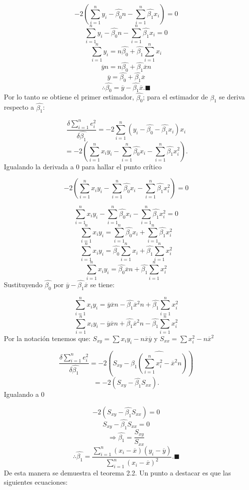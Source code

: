 \documentclass[
  a4paper,
  oneside,
  openany]{book}
\begin{document}
\[-2\left(\sum_{i=1}^{n}y_{i}-\hat{\beta_{0}}n-\sum_{i=1}^{n}\hat{\beta_{1}}x_{i}\right)=0\]
\[\sum_{i=1}^{n}y_{i}-\hat{\beta_{0}}n-\sum_{i=1}^{n}\hat{\beta_{1}}x_{i}=0\]
\[\sum_{i=1}^{n}y_{i}=n\hat{\beta_{0}}+\hat{\beta_{1}}\sum_{i=1}^{n}x_{i}\]
\[\overline{y}n=n\hat{\beta_{0}}+\hat{\beta_{1}}\overline{x}n\]
\[\overline{y}=\hat{\beta_{0}}+\hat{\beta_{1}}\overline{x}\]
\[\therefore\hat{\beta_{0}}=\overline{y}-\hat{\beta_{1}}\overline{x}.\blacksquare\]
Por lo tanto se obtiene el primer estimador, \(\hat{\beta_{0}}\); para el estimador de \(\beta_{1}\) se deriva respecto a \(\hat{\beta_{1}}\):

\[\frac{\delta\sum_{i=1}^{n}e_{i}^2}{\delta\hat{\beta_{1}}}=-2\sum_{i=1}^{n}(y_{i}-\hat{\beta_{0}}-\hat{\beta_{1}}x_{i})x_{i}\]
\[=-2\left(\sum_{i=1}^{n}x_{i}y_{i}-\sum_{i=1}^{n}\hat{\beta_{0}}x_{i}-\sum_{i=1}^{n}\hat{\beta_{1}}x_{i}^2\right).\]
Igualando la derivada a 0 para hallar el punto crítico

\[-2\left(\sum_{i=1}^{n}x_{i}y_{i}-\sum_{i=1}^{n}\hat{\beta_{0}}x_{i}-\sum_{i=1}^{n}\hat{\beta_{1}}x_{i}^2\right)=0\]

\[\sum_{i=1}^{n}x_{i}y_{i}-\sum_{i=1}^{n}\hat{\beta_{0}}x_{i}-\sum_{i=1}^{n}\hat{\beta_{1}}x_{i}^2=0\]
\[\sum_{i=1}^{n}x_{i}y_{i}=\sum_{i=1}^{n}\hat{\beta_{0}}x_{i}+\sum_{i=1}^{n}\hat{\beta_{1}}x_{i}^2\]
\[\sum_{i=1}^{n}x_{i}y_{i}=\hat{\beta_{0}}\sum_{i=1}^{n}x_{i}+\hat{\beta_{1}}\sum_{i=1}^{n}x_{i}^2\]
\[\sum_{i=1}^{n}x_{i}y_{i}=\hat{\beta_{0}}\overline{x}n+\hat{\beta_{1}}\sum_{i=1}^{n}x_{i}^2\]
Sustituyendo \(\hat{\beta_{0}}\) por \(\overline{y}-\hat{\beta_{1}}\overline{x}\) se tiene:

\[\sum_{i=1}^{n}x_{i}y_{i}=\overline{y}\overline{x}n-\hat{\beta_{1}}\overline{x}^2n+\hat{\beta_{1}}\sum_{i=1}^{n}x_{i}^2\]
\[\sum_{i=1}^{n}x_{i}y_{i}-\overline{y}\overline{x}n+\hat{\beta_{1}}\overline{x}^2n-\hat{\beta_{1}}\sum_{i=1}^{n}x_{i}^2\]
Por la notación tenemos que: \(S_{xy}=\sum x_{i}y_{i} - n \overline{x}\overline{y}\) y \(S_{xx}= \sum x_{i}^2 - n\overline{x}^2\)

\[\frac{\delta \sum_{i=1}^{n}e_{i}^2}{\delta\hat{\beta_{1}}}=-2\left(S_{xy}-\hat{\beta_{1}\left(\sum_{i=1}^{n}x_{i}^2-\overline{x}^2n\right)}\right)\]
\[=-2(S_{xy}-\hat{\beta_{1}}S_{xx}).\]
Igualando a 0

\[-2(S_{xy}-\hat{\beta_{1}}S_{xx})=0\]
\[S_{xy}-\hat{\beta_{1}}S_{xx}=0\]
\[\Rightarrow \hat{\beta_{1}}=\frac{S_{xy}}{S_{xx}}\]
\[\therefore \hat{\beta_{1}}=\frac{\sum_{i=1}^{n}(x_{i}-\overline{x})(y_{i}-\overline{y})}{\sum_{i=1}^{n}(x_{i}-\overline{x})^2}.\blacksquare\]
De esta manera se demuestra el teorema 2.2. Un punto a destacar es que las siguientes ecuaciones:
\end{document}
